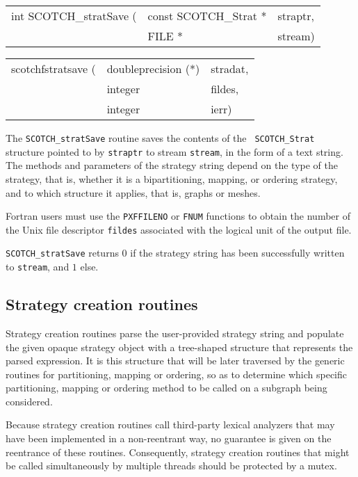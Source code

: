 \begin{itemize}
\progsyn

{\tt\begin{tabular}{l@{}ll}
int SCOTCH\_stratSave ( & const SCOTCH\_Strat * & straptr, \\
                        & FILE *                & stream)
\end{tabular}}

{\tt\begin{tabular}{l@{}ll}
scotchfstratsave ( & doubleprecision (*) & stradat, \\
                   & integer             & fildes,  \\
                   & integer             & ierr)
\end{tabular}}

\progdes

The {\tt SCOTCH\_stratSave} routine saves the contents of the {\tt
SCOTCH\_\lbt Strat} structure pointed to by {\tt straptr} to stream
{\tt stream}, in the form of a text string. The methods and
parameters of the strategy string depend on the type of the strategy,
that is, whether it is a bipartitioning, mapping, or ordering
strategy, and to which structure it applies, that is, graphs or
meshes.

Fortran users must use the {\tt PXFFILENO} or {\tt FNUM} functions to
obtain the number of the Unix file descriptor {\tt fildes} associated
with the logical unit of the output file.

\progret

{\tt SCOTCH\_stratSave} returns $0$ if the strategy string has been
successfully written to {\tt stream}, and $1$ else.
\end{itemize}

\subsection{Strategy creation routines}
\label{sec-lib-strat-creation}

Strategy creation routines parse the user-provided strategy string and
populate the given opaque strategy object with a tree-shaped structure
that represents the parsed expression. It is this structure that will
be later traversed by the generic routines for partitioning, mapping or
ordering, so as to determine which specific partitioning, mapping or
ordering method to be called on a subgraph being considered.

Because strategy creation routines call third-party lexical analyzers
that may have been implemented in a non-reentrant way, no guarantee is
given on the reentrance of these routines. Consequently, strategy
creation routines that might be called simultaneously by multiple
threads should be protected by a mutex.

